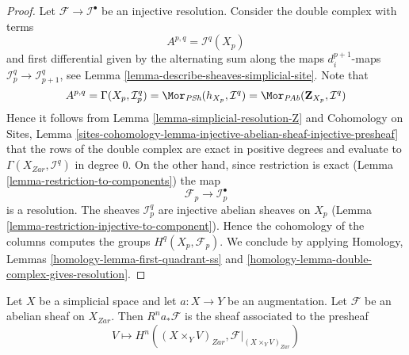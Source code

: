 \begin{proof}
Let $\mathcal{F} \to \mathcal{I}^\bullet$ be an injective resolution.
Consider the double complex with terms
$$
A^{p, q} = \mathcal{I}^q(X_p)
$$
and first differential given by the alternating sum along the maps
$d^{p + 1}_i$-maps $\mathcal{I}_p^q \to \mathcal{I}_{p + 1}^q$, see
Lemma \ref{lemma-describe-sheaves-simplicial-site}. Note that
$$
A^{p, q} = \Gamma(X_p, \mathcal{I}_p^q) =
\Mor_{\textit{PSh}}(h_{X_p}, \mathcal{I}^q) =
\Mor_{\textit{PAb}}(\mathbf{Z}_{X_p}, \mathcal{I}^q)
$$
Hence it follows from Lemma \ref{lemma-simplicial-resolution-Z} and
Cohomology on Sites, Lemma
\ref{sites-cohomology-lemma-injective-abelian-sheaf-injective-presheaf}
that the rows of the double complex are exact in positive degrees and
evaluate to $\Gamma(X_{Zar}, \mathcal{I}^q)$ in degree $0$.
On the other hand, since restriction is exact
(Lemma \ref{lemma-restriction-to-components})
the map
$$
\mathcal{F}_p \to \mathcal{I}_p^\bullet
$$
is a resolution. The sheaves $\mathcal{I}_p^q$ are injective
abelian sheaves on $X_p$
(Lemma \ref{lemma-restriction-injective-to-component}).
Hence the cohomology of the columns computes the groups
$H^q(X_p, \mathcal{F}_p)$. We conclude by applying
Homology, Lemmas \ref{homology-lemma-first-quadrant-ss} and
\ref{homology-lemma-double-complex-gives-resolution}.
\end{proof}

\begin{lemma}
\label{lemma-augmentation-pushforward-higher-direct-image}
Let $X$ be a simplicial space and let $a : X \to Y$
be an augmentation. Let $\mathcal{F}$ be an abelian sheaf
on $X_{Zar}$. Then $R^na_*\mathcal{F}$ is the sheaf associated
to the presheaf
$$
V \longmapsto H^n((X \times_Y V)_{Zar}, \mathcal{F}|_{(X \times_Y V)_{Zar}})
$$
\end{lemma}

